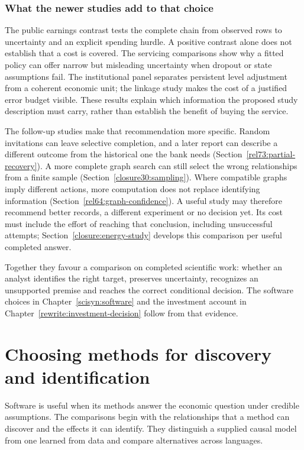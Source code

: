 \section{What the newer studies add to that choice}
The public earnings contrast tests the complete chain from observed rows to
uncertainty and an explicit spending hurdle. A positive contrast alone does
not establish that a cost is covered. The servicing comparisons show why a
fitted policy can offer narrow but misleading uncertainty when dropout or
state assumptions fail. The institutional panel separates persistent level
adjustment from a coherent economic unit; the linkage study makes the cost
of a justified error budget visible. These results explain which information
the proposed study description must carry, rather than establish the benefit
of buying the service.

The follow-up studies make that recommendation more specific. Random
invitations can leave selective completion, and a later report can describe
a different outcome from the historical one the bank needs
(Section~\ref{rel73:partial-recovery}). A more complete graph search can
still select the wrong relationships from a finite sample
(Section~\ref{closure30:sampling}). Where compatible graphs imply different
actions, more computation does not replace identifying information
(Section~\ref{rel64:graph-confidence}). A useful study may therefore
recommend better records, a different experiment or no decision yet.
Its cost must include the effort of reaching that conclusion, including
unsuccessful attempts; Section~\ref{closure:energy-study} develops this
comparison per useful completed answer.

Together they favour a comparison on completed scientific work: whether an
analyst identifies the right target, preserves uncertainty, recognizes an
unsupported premise and reaches the correct conditional decision. The
software choices in Chapter~\ref{scisyn:software} and the investment account
in Chapter~\ref{rewrite:investment-decision} follow from that evidence.



\part{Choosing methods for discovery and identification}
\label{reading:part-methods}
Software is useful when its methods answer the economic question under
credible assumptions. The comparisons begin with the relationships that a
method can discover and the effects it can identify. They distinguish a supplied
causal model from one learned from data and compare alternatives across languages.


